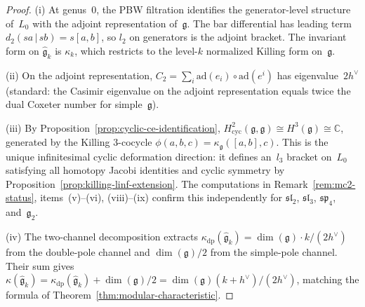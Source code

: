\begin{proof}
(i)\enspace
At genus~$0$, the PBW filtration identifies the generator-level
structure of~$L_0$ with the adjoint representation
of~$\mathfrak{g}$. The bar differential has leading term
$d_2(sa\,|\,sb) = s[a,b]$, so $l_2$ on generators is the adjoint
bracket. The invariant form on $\widehat{\mathfrak{g}}_k$ is
$\kappa_k$, which restricts to the level-$k$ normalized Killing
form on~$\mathfrak{g}$.

(ii)\enspace
On the adjoint representation, $C_2 = \sum_i \mathrm{ad}(e_i)
\circ\mathrm{ad}(e^i)$ has eigenvalue~$2h^\vee$ (standard: the
Casimir eigenvalue on the adjoint representation equals twice the
dual Coxeter number for simple~$\mathfrak{g}$).

(iii)\enspace
By Proposition~\ref{prop:cyclic-ce-identification},
$H^2_{\mathrm{cyc}}(\mathfrak{g},\mathfrak{g})\cong
H^3(\mathfrak{g})\cong\mathbb{C}$, generated by the Killing
$3$-cocycle $\phi(a,b,c)=\kappa_{\mathfrak{g}}([a,b],c)$. This is the unique
infinitesimal cyclic deformation direction: it defines
an~$l_3$ bracket on~$L_0$ satisfying all homotopy Jacobi
identities and cyclic symmetry by
Proposition~\ref{prop:killing-linf-extension}.
The computations in
Remark~\ref{rem:mc2-status}, items~(v)--(vi),
(viii)--(ix) confirm this independently for
$\mathfrak{sl}_2$, $\mathfrak{sl}_3$,
$\mathfrak{sp}_4$, and~$\mathfrak{g}_2$.

(iv)\enspace
The two-channel decomposition extracts
$\kappa_{\mathrm{dp}}(\widehat{\mathfrak{g}}_k) = \dim(\mathfrak{g})\cdot k/(2h^\vee)$ from the
double-pole channel and $\dim(\mathfrak{g})/2$ from the
simple-pole channel. Their sum gives
$\kappa(\widehat{\mathfrak{g}}_k) = \kappa_{\mathrm{dp}}(\widehat{\mathfrak{g}}_k) + \dim(\mathfrak{g})/2
= \dim(\mathfrak{g})(k+h^\vee)/(2h^\vee)$, matching the
formula of Theorem~\ref{thm:modular-characteristic}.
\end{proof}

